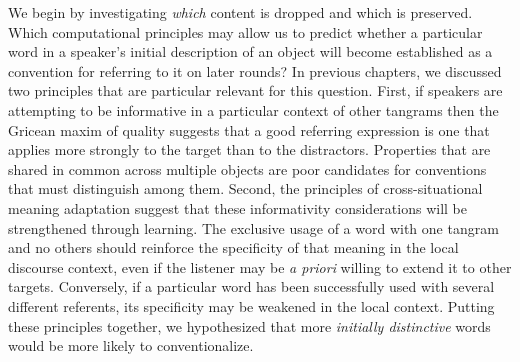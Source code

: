\documentclass[alpha-refs]{wiley-article}
\begin{document}
We begin by investigating \emph{which} content is dropped and which is preserved.
Which computational principles may allow us to predict whether a particular word in a speaker's initial description of an object will become established as a convention for referring to it on later rounds?
In previous chapters, we discussed two principles that are particular relevant for this question.
First, if speakers are attempting to be informative in a particular context of other tangrams then the Gricean maxim of quality suggests that a good referring expression is one that applies more strongly to the target than to the distractors. 
Properties that are shared in common across multiple objects are poor candidates for conventions that must distinguish among them.
Second, the principles of cross-situational meaning adaptation suggest that these informativity considerations will be strengthened through learning.
The exclusive usage of a word with one tangram and no others should reinforce the specificity of that meaning in the local discourse context, even if the listener may be \emph{a priori} willing to extend it to other targets.
Conversely, if a particular word has been successfully used with several different referents, its specificity may be weakened in the local context.
Putting these principles together, we hypothesized that more \emph{initially distinctive} words would be more likely to conventionalize.
\end{document}
